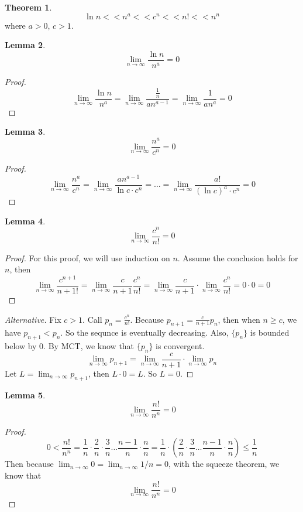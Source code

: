 \documentclass{article}
\theoremstyle{definition}
\newtheorem{theorem}{Theorem}[section]
\newtheorem{lemma}[theorem]{Lemma}
\theoremstyle{remark}
\begin{document}
\begin{theorem}
    \[
    \ln n << n^a << c^n << n! <<n^n
    \]
    where $a>0$, $c>1$.
\end{theorem}

\begin{lemma}
    \[
    \lim_{n\rightarrow\infty} \frac{\ln n}{n^a}=0
    \]
\end{lemma}

\begin{proof}
    \[
    \lim_{n\rightarrow\infty} \frac{\ln n}{n^a}= \lim_{n\rightarrow\infty} \frac{\frac{1}{n}}{an^{a-1}}= \lim_{n\rightarrow\infty} \frac{1}{an^a}=0
    \]
\end{proof}

\begin{lemma}
    \[
    \lim_{n\rightarrow\infty} \frac{n^a}{c^n}=0
    \]
\end{lemma}

\begin{proof}
    \[
    \lim_{n\rightarrow\infty} \frac{n^a}{c^n}= \lim_{n\rightarrow\infty}\frac{an^{a-1}}{\ln c\cdot c^n}=\dots =\lim_{n\rightarrow\infty}\frac{a!}{(\ln c)^a\cdot c^n}=0
    \]
\end{proof}

\begin{lemma}
    \[
    \lim_{n\rightarrow\infty} \frac{c^n}{n!}=0
    \]
\end{lemma}

\begin{proof}
    For this proof, we will use induction on $n$.
    Assume the conclusion holds for $n$, then 
    \[
    \lim_{n\rightarrow\infty} \frac{c^{n+1}}{{n+1}!} = \lim_{n\rightarrow\infty} \frac{c}{{n+1}}\frac{c^{n}}{{n}!} = \lim_{n\rightarrow\infty} \frac{c}{{n+1}}\cdot\lim_{n\rightarrow\infty} \frac{c^{n}}{{n}!}=0\cdot 0=0
    \]
\end{proof}

\begin{proof}[Alternative]
    Fix $c>1$.
    Call $p_n=\frac{c^n}{n!}$.
    Because $p_{n+1}=\frac{c}{n+1}p_n$, then when $n\geq c$, we have $p_{n+1}<p_n$. So the sequnce is eventually decreasing.
    Also, $\{p_n\}$ is bounded below by 0.
    By MCT, we know that $\{p_n\}$ is convergent.
    \[
    \lim_{n\rightarrow\infty} p_{n+1}=\lim_{n\rightarrow\infty} \frac{c}{{n+1}}\cdot\lim_{n\rightarrow\infty} p_n
    \]
    Let $L=\lim_{n\rightarrow\infty} p_{n+1}$, then $L\cdot0=L$. So $L=0$.
\end{proof}

\begin{lemma}
    \[
    \lim_{n\rightarrow\infty} \frac{n!}{n^n}=0
    \]
\end{lemma}

\begin{proof}
    \[
    0<\frac{n!}{n^n}=\frac{1}{n}\cdot \frac{2}{n}\cdot \frac{3}{n}\dots \frac{n-1}{n}\cdot \frac{n}{n}=\frac{1}{n}\cdot \left(\frac{2}{n}\cdot \frac{3}{n}\dots \frac{n-1}{n}\cdot \frac{n}{n}\right)\leq \frac{1}{n}
    \]
    Then because $\lim_{n\rightarrow\infty}0=\lim_{n\rightarrow\infty}1/n=0$, with the squeeze theorem, we know that 
    \[
    \lim_{n\rightarrow\infty} \frac{n!}{n^n}=0
    \]
\end{proof}
\end{document}
